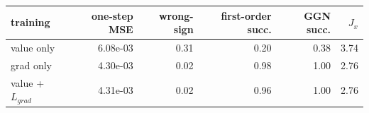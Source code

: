 \begin{tabular}{lrrrrr}
\toprule
training & one-step MSE & wrong-sign & first-order succ. & GGN succ. & $J_x$ \\
\midrule
value only & 6.08e-03 & 0.31 & 0.20 & 0.38 & 3.74 \\
grad only & 4.30e-03 & 0.02 & 0.98 & 1.00 & 2.76 \\
value +$L_{grad}$ & 4.31e-03 & 0.02 & 0.96 & 1.00 & 2.76 \\
\bottomrule
\end{tabular}